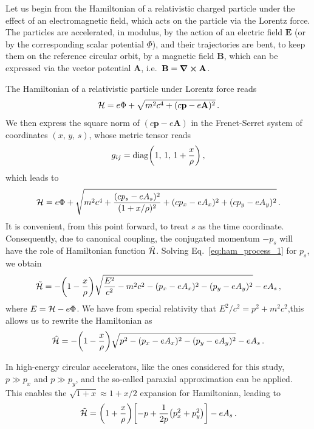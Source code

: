 Let us begin from the Hamiltonian of a relativistic charged particle under the effect of an electromagnetic field, which acts on the particle via the Lorentz force. The particles are accelerated, in modulus, by the action of an electric field $\mathbf{E}$ (or by the corresponding scalar potential $\Phi$), and their trajectories are bent, to keep them on the reference circular orbit, by a magnetic field $\mathbf{B}$, which can be expressed via the vector potential $\mathbf{A}$, i.e.\ $\mathbf{B}=\curl\mathbf{A}$.

The Hamiltonian of a relativistic particle under Lorentz force reads
%
\begin{equation}
    \mathcal{H} = e\Phi + \sqrt{ m^2c^4 + (c\mathbf{p}-e\mathbf{A})^2 }\,. 
\end{equation}
%
We then express the square norm of $(c\mathbf{p}-e\mathbf{A})$ in the Frenet-Serret system of coordinates $(x,\,y,\,s)$, whose metric tensor reads
%
\begin{equation} 
    g_{ij} = \mathrm{diag}\qty(1,\,1,\,1+\frac{x}{\rho})\,, 
\end{equation}
%
which leads to
%
\begin{equation}
    \mathcal{H} = e\Phi + \sqrt{ m^2c^4 + \frac{(cp_s-eA_s)^2}{(1+x/\rho)^2 } + (cp_x-eA_x)^2+ (cp_y-eA_y)^2}\,.
    \label{eq:ham_process_1}
\end{equation}
%
It is convenient, from this point forward, to treat $s$ as the time coordinate. Consequently, due to canonical coupling, the conjugated momentum $-p_s$ will have the role of Hamiltonian function $\tilde{\mathcal{H}}$. Solving Eq.~\eqref{eq:ham_process_1} for $p_s$, we obtain
%
\begin{equation} 
    \tilde{\mathcal{H}} = -\qty(1-\frac{x}{\rho})\sqrt{\frac{E^2}{c^2}-m^2c^2-(p_x-eA_x)^2-(p_y-eA_y)^2} - eA_s\,,
\end{equation}
%
where $E=\mathcal{H}-e\Phi$. We have from special relativity that $E^2/c^2 = p^2 + m^2c^2$,this allows us to rewrite the Hamiltonian as
\begin{equation}
    \tilde{\mathcal{H}} = -\qty(1-\frac{x}{\rho})\sqrt{p^2-(p_x-eA_x)^2-(p_y-eA_y)^2} - eA_s\,.
\end{equation}

In high-energy circular accelerators, like the ones considered for this study,  $p\gg p_x$ and $p\gg p_y$, and the so-called paraxial approximation can be applied. This enables the $\sqrt{1+x}\approx 1+x/2$ expansion for Hamiltonian, leading to
%
\begin{equation} 
	\tilde{\mathcal{H}} = \qty(1+\frac{x}{\rho})\qty[-p + \frac{1}{2p}\qty(p_x^2+p_y^2)] -eA_s\,. 
	\label{eq:hamem}
\end{equation}

